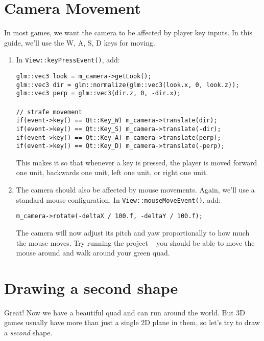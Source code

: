 \documentclass{cs195u}
\begin{document}
\section*{Camera Movement}

In most games, we want the camera to be affected by player key inputs. In this guide, we’ll use the W, A, S, D keys for moving.

\begin{enumerate}
\item In \texttt{View::keyPressEvent()}, add:

     \texttt{glm::vec3 look = m\_camera->getLook();}\\
     \texttt{glm::vec3 dir = glm::normalize(glm::vec3(look.x, 0, look.z));}\\
     \texttt{glm::vec3 perp = glm::vec3(dir.z, 0, -dir.x);}\\\\
     \texttt{// strafe movement}\\
     \texttt{if(event->key() == Qt::Key\_W) m\_camera->translate(dir);}\\
     \texttt{if(event->key() == Qt::Key\_S) m\_camera->translate(-dir);}\\
     \texttt{if(event->key() == Qt::Key\_A) m\_camera->translate(perp);}\\
     \texttt{if(event->key() == Qt::Key\_D) m\_camera->translate(-perp);}
     
This makes it so that whenever a key is pressed, the player is moved forward one unit, backwards one unit, left one unit, or right one unit.

\item The camera should also be affected by mouse movements. Again, we’ll use a standard mouse configuration. In \texttt{View::mouseMoveEvent()}, add:

     \texttt{m\_camera->rotate(-deltaX / 100.f, -deltaY / 100.f);}
     
The camera will now adjust its pitch and yaw proportionally to how much the mouse moves. Try running the project – you should be able to move the mouse around and walk around your green quad.
\end{enumerate}


\section*{Drawing a second shape}

Great! Now we have a beautiful quad and can run around the world. But 3D games usually have more than just a single 2D plane in them, so let’s try to draw a \emph{second} shape.
\end{document}
